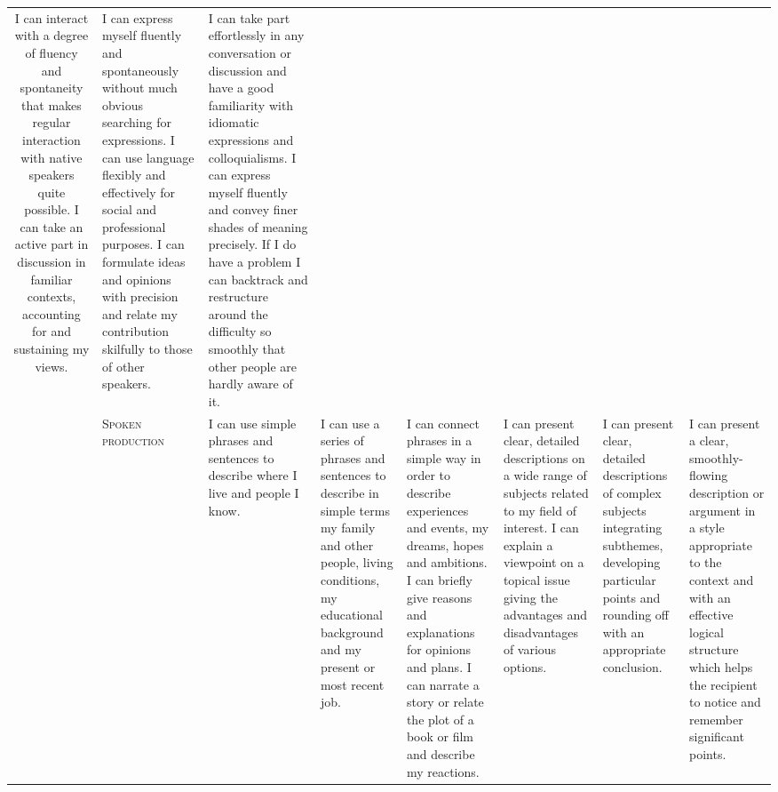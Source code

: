 \begin{tabular}{|c|p{1.5cm}|p{2cm}|p{2cm}|p{2cm}|p{2cm}|p{2cm}|p{2cm}|}
\scriptsize I can interact with
a degree of fluency
and spontaneity
that makes regular
interaction with
native speakers
quite possible. I
can take an active
part in discussion
in familiar
contexts,
accounting for and
sustaining my
views. &

\scriptsize I can express
myself fluently and
spontaneously
without much
obvious searching
for expressions. I
can use language
flexibly and
effectively for
social and
professional
purposes. I can
formulate ideas
and opinions with
precision and relate
my contribution
skilfully to those of
other speakers. &

\scriptsize I can take part
effortlessly in any
conversation or
discussion and
have a good
familiarity with
idiomatic
expressions and
colloquialisms. I
can express myself
fluently and convey
finer shades of
meaning precisely.
If I do have a
problem I can
backtrack and
restructure around
the difficulty so
smoothly that other
people are hardly
aware of it. \\ \cline{2-8}

& \small\scshape Spoken production &

\scriptsize I can use simple
phrases and
sentences to
describe where I
live and people I
know. &

\scriptsize I can use a series
of phrases and
sentences to
describe in simple
terms my family
and other people,
living conditions,
my educational
background and my
present or most
recent job. &

\scriptsize I can connect
phrases in a simple
way in order to
describe
experiences and
events, my
dreams, hopes and
ambitions. I can
briefly give reasons
and explanations
for opinions and
plans. I can
narrate a story or
relate the plot of a
book or film and
describe my
reactions. &

\scriptsize I can present clear,
detailed
descriptions on a
wide range of
subjects related to
my field of interest.
I can explain a
viewpoint on a
topical issue giving
the advantages
and disadvantages
of various options. &

\scriptsize I can present clear,
detailed
descriptions of
complex subjects
integrating
subthemes,
developing
particular points
and rounding off
with an appropriate
conclusion. &

\scriptsize I can present a
clear,
smoothly-flowing
description or
argument in a style
appropriate to the
context and with an
effective logical
structure which
helps the recipient
to notice and
remember
significant points. \\ \hline

\end{tabular}

